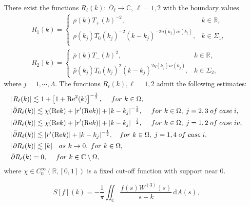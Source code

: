 \documentclass[10pt,a4paper]{amsart}
\begin{document}
\begin{Proposition}\label{p11}
There exist  the functions $R_{\ell}(k)$: $\bar{\Omega}_{\ell}\to \mathbb{C}$, $\ell=1,2$  with the boundary values
	\begin{align} &R_{1}(k)=\left\{\begin{array}{ll}
	\rho(k)T_+(k)^{-2}, &k\in \mathbb{R},\\[4pt]
 \rho(k_j)T_0(k_j)^{-2} (k-k_j)^{-2\eta(k_j)i\nu(k_j)},  &k\in \Sigma_{1},\\
	\end{array}\right.\label{eq4} \\[5pt]
	&R_{2}(k)=\left\{\begin{array}{ll} \bar{\rho}(k)T_-(k)^{2},
 &k\in  \mathbb{R},\\[4pt] \bar{\rho}(k_j)T_0(k_j)^{2}(k-k_j)^{2\eta(k_j)i\nu(k_j)}, &k\in \Sigma_{2},
	\end{array} \right.
	\end{align}	
where $j=1,\cdots, \Lambda$.
The functions  $R_{\ell}(k), \ell=1,2$ admit the following estimates:
	\begin{align}
    &|R_{\ell}(k)|\lesssim 1+\left[1+\mathrm{Re}^2(k)\right]^{-\frac{1}{2}},\quad\;for\ k \in\Omega,\label{eq5}\\
    &|\bar{\partial}R_{\ell}(k)|\lesssim\chi(\mathrm{Re}k)+|r^\prime(\mathrm{Re}k)|+|k-k_j|^{-\frac{1}{2}}, \quad   \;for\  k\in \Omega,\;j=2,3 \;of\;case\;\textup{\uppercase\expandafter{\romannumeral1}},\label{eq6}\\
     &|\bar{\partial}R_{\ell}(k)|\lesssim \chi(\mathrm{Re}k)+|r'(\mathrm{Re}k)|+|k-k_j|^{-\frac{1}{2}}, \quad \; for\   k\in \Omega, \;j=1,2\;of\;case\;\textup{\uppercase\expandafter{\romannumeral4}},\label{eq7}\\
	&|\bar{\partial}R_{\ell}(k)|\lesssim|r'(\mathrm{Re}k)|+|k-k_j|^{-\frac{1}{2}}, \quad  for\   k\in \Omega, \;j=1,4\;of\;case\;\textup{\uppercase\expandafter{\romannumeral1}},\label{eq8}\\
&|\bar{\partial}R_{\ell}(k)|\lesssim|k| \quad as\ k\to0,\;for\ k\in \Omega,\label{eq9}\\
&\bar{\partial}R_{\ell}(k)=0,\quad \;for\ k\in\mathbb{C}\setminus\Omega,\nonumber
	\end{align}
where $\chi \in C^{\infty}_0(\mathbb{R},[0,1])$ is a fixed cut-off function with support near 0.
\end{Proposition}

\begin{equation}\label{eq36}
    S\left[f\right](k) = -\frac{1}{\pi} \iint_\mathbb{C} \frac{f(s) W^{(3)}(s)}{s - k} \, \mathrm{d}A(s),
\end{equation}
\end{document}
